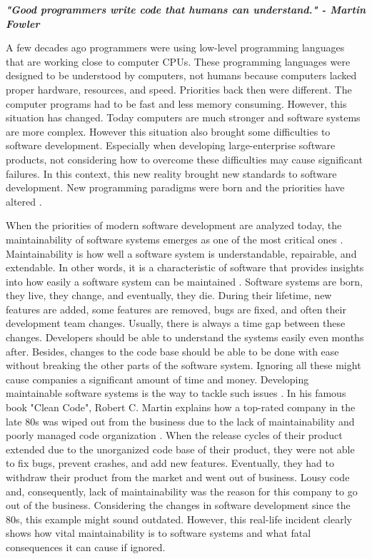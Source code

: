 \textbf{\textit{"Good programmers write code that humans can understand." - Martin Fowler}} \cite{21}

A few decades ago programmers were using low-level programming languages that are working close to computer CPUs. These programming languages were designed to be understood by computers, not humans because computers lacked proper hardware, resources, and speed. Priorities back then were different. The computer programs had to be fast and less memory consuming. However, this situation has changed. Today computers are much stronger and software systems are more complex. However this situation also brought some difficulties to software development. Especially when developing large-enterprise software products, not considering how to overcome these difficulties may cause significant failures. In this context,  this new reality brought new standards to software development. New programming paradigms were born and the priorities have altered \cite{12}.

When the priorities of modern software development are analyzed today, the maintainability of software systems emerges as one of the most critical ones \cite{53}. Maintainability is how well a software system is understandable, repairable, and extendable. In other words, it is a characteristic of software that provides insights into how easily a software system can be maintained \cite{54}. Software systems are born, they live, they change, and eventually, they die. During their lifetime, new features are added, some features are removed, bugs are fixed, and often their development team changes. Usually, there is always a time gap between these changes. Developers should be able to understand the systems easily even months after. Besides, changes to the code base should be able to be done with ease without breaking the other parts of the software system. Ignoring all these might cause companies a significant amount of time and money. Developing maintainable software systems is the way to tackle such issues \cite{50}. In his famous book "Clean Code", Robert C. Martin explains how a top-rated company in the late 80s was wiped out from the business due to the lack of maintainability and poorly managed code organization \cite{11}. When the release cycles of their product extended due to the unorganized code base of their product, they were not able to fix bugs, prevent crashes, and add new features. Eventually, they had to withdraw their product from the market and went out of business. Lousy code and, consequently, lack of maintainability was the reason for this company to go out of the business. Considering the changes in software development since the 80s, this example might sound outdated. However, this real-life incident clearly shows how vital maintainability is to software systems and what fatal consequences it can cause if ignored. 

